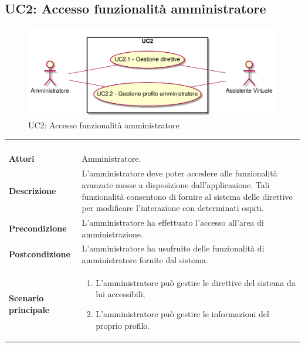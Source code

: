 \newpage\subsection{UC2: Accesso funzionalità amministratore}
\label{UC2}
\begin{figure}[h]
	\centering
	\includegraphics[width=\textwidth,height=\textheight,keepaspectratio]{images/UseCaseUC2.png}
	\caption{UC2: Accesso funzionalità amministratore}
\end{figure}
\begin{longtable}{l|p{10cm}}
	\rowcolor[gray]{0.8} \multicolumn{2}{c}{} \\
	\rowcolor[gray]{0.8} \multicolumn{2}{c}{\textbf{UC2 - Accesso funzionalità amministratore}} \\
	\rowcolor[gray]{0.8} \multicolumn{2}{c}{} \\
	\hline
	&\\
	\textbf{Attori} & Amministratore.\\[7pt]
	\textbf{Descrizione} & L'amministratore deve poter accedere alle funzionalità avanzate messe a disposizione dall'applicazione. Tali funzionalità consentono di fornire al sistema delle direttive per modificare l'interazione con determinati ospiti.\\[7pt]
	\textbf{Precondizione} & L'amministratore ha effettuato l'accesso all'area di amministrazione.\\[7pt]
	\textbf{Postcondizione} & L'amministratore ha usufruito delle funzionalità di amministratore fornite dal sistema.\\[7pt]
	\textbf{Scenario principale} &\begin{enumerate}
		\item  L'amministratore può gestire le direttive del sistema da lui accessibili;
		\item  L'amministratore può gestire le informazioni del proprio profilo.
	\end{enumerate}
	\\[7pt]\hline
\end{longtable}

